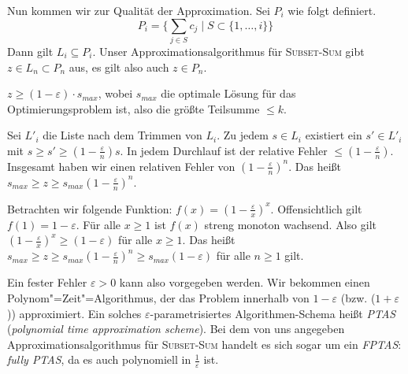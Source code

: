 Nun kommen wir zur Qualität der Approximation. Sei $P_i$ wie folgt definiert.
\[ P_i = \{ \sum_{j \in S} c_j \mid S \subset \{ 1, \ldots, i \} \} \]
Dann gilt $L_i \subseteq P_i$. Unser Approximationsalgorithmus für \textsc{Subset-Sum} gibt $z \in L_n \subset P_n$ aus, es gilt also auch $z \in P_n$.

\begin{Beh}
  \hspace{\parindent} $z \ge (1- \varepsilon) \cdot s_{max}$, wobei $s_{max}$ die optimale Lösung für das Optimierungsproblem ist, also die größte Teilsumme $\le k$.
\end{Beh}

\begin{Bew}
  \hspace{\parindent}Sei $L'_i$ die Liste nach dem Trimmen von $L_i$. Zu jedem $s \in L_i$ existiert ein $s' \in L'_i$ mit $s \ge s' \ge (1 - \frac{\varepsilon}{n}) s$. In jedem Durchlauf ist der relative Fehler $\le (1- \frac{\varepsilon}{n})$. Insgesamt haben wir einen relativen Fehler von $(1- \frac{\varepsilon}{n})^n$. Das heißt $s_{max} \ge z \ge s_{max} (1- \frac{\varepsilon}{n})^n$.
  
  
  Betrachten wir folgende Funktion: $f(x) = (1- \frac{\varepsilon}{x})^x$. Offensichtlich gilt $f(1) = 1 - \varepsilon$. Für alle $x \ge 1$ ist $f(x)$ streng monoton wachsend. Also gilt $(1- \frac{\varepsilon}{x})^x \ge (1-\varepsilon)$ für alle $x \ge 1$. Das heißt $s_{max} \ge z \ge s_{max} (1- \frac{\varepsilon}{n})^n \ge s_{max} (1-\varepsilon)$ für alle $n \ge 1$ gilt.
  
\end{Bew}

Ein fester Fehler $\varepsilon > 0$ kann also vorgegeben werden. Wir bekommen einen Polynom"=Zeit"=Algorithmus, der das Problem innerhalb von $1 - \varepsilon$ (bzw. ($1+ \varepsilon$)) approximiert. Ein solches $\varepsilon$-parametrisiertes Algorithmen-Schema heißt \textit{PTAS} (\textit{polynomial time approximation scheme}). Bei dem von uns angegeben Approximationsalgorithmus für \textsc{Subset-Sum} handelt es sich sogar um ein \textit{FPTAS}: \textit{fully PTAS}, da es auch polynomiell in $\frac{1}{\varepsilon}$ ist.

